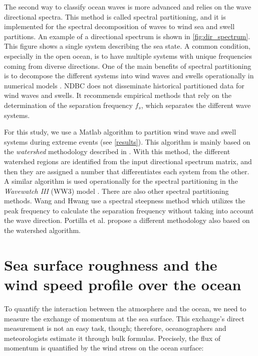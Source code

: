 The second way to classify ocean waves is more advanced and relies on the wave directional spectra. This method is called spectral partitioning, and it is implemented for the spectral decomposition of waves to wind sea and swell partitions. An example of a directional spectrum is shown in \ref{fig:dir_spectrum}. This figure shows a single system describing the sea state. A common condition, especially in the open ocean, is to have multiple systems with unique frequencies coming from diverse directions. One of the main benefits of spectral partitioning is to decompose the different systems into wind waves and swells operationally in numerical models \cite{Organization1998a}. NDBC does not disseminate historical partitioned data for wind waves and swells. It recommends empirical methods \cite{Gilhousen2001} that rely on the determination of the separation frequency $f_{s}$, which separates the different wave systems.

For this study, we use a Matlab algorithm \cite{Douglas2019} to partition wind wave and swell systems during extreme events (see \ref{results}). This algorithm is mainly based on the \emph{watershed} methodology described in \cite{Hanson2001a}. With this method, the different watershed regions are identified from the input directional spectrum matrix, and then they are assigned a number that differentiates each system from the other. A similar algorithm is used operationally for the spectral partitioning in the \emph{Wavewatch III} (WW3) model \cite{WW2019a}. There are also other spectral partitioning methods. Wang and Hwang \cite{Wang2001} use a spectral steepness method which utilizes the peak frequency to calculate the separation frequency without taking into account the wave direction. Portilla et al. \cite{Portilla2009} propose a different methodology also based on the watershed algorithm.




\section{Sea surface roughness and the wind speed profile over the ocean}\label{WindProfile}


To quantify the interaction between the atmosphere and the ocean, we need to measure the exchange of momentum at the sea surface. This exchange's direct measurement is not an easy task, though; therefore, oceanographers and meteorologists estimate it through bulk formulas. Precisely, the flux of momentum is quantified by the wind stress on the ocean surface:

